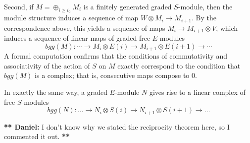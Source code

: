 \documentclass[twoside,12pt, leqno]{amsart}
\def\daniel#1{{\bf *** Daniel:} #1 {\bf ***}}
\begin{document}
Second, if $M = \oplus_{i\geq i_0} M_i$ is a finitely generated graded $S$-module, then the module structure induces a sequence of map $W\otimes M_i \to M_{i+1}$.  By the correspondence above, this yields a sequence of maps $M_i\to M_{i+1}\otimes V$, which induces a sequence of
linear maps of graded free $E$-modules 
$$ 
bgg(M): \cdots \to M_i\otimes E(i) \to M_{i+1}\otimes E(i+1) \to \cdots
$$
A formal computation confirms that the conditions of commutativity and associativity of the action of $S$ on $M$ exactly correspond to the condition that $bgg(M)$ is a complex; that is, consecutive maps compose to 0.

In exactly the same way, a graded $E$-module $N$ gives rise to a linear  complex of free $S$-modules
$$bgg(N): \ldots \to N_i \otimes S(i) \to N_{i+1} \otimes  S(i+1) \to \ldots $$

\daniel{I don't know why we stated the reciprocity theorem here, so I commented it out.}
%
%
%
%
\end{document}

